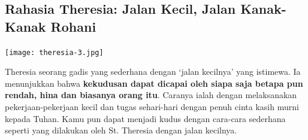 \subsection*{Rahasia Theresia: Jalan Kecil, Jalan Kanak-Kanak Rohani}

\begin{floatingfigure}[l]{2.75cm}
\begin{center}
\texttt{[image: theresia-3.jpg]}
\end{center}
\end{floatingfigure}
Theresia seorang gadis yang sederhana dengan `jalan kecilnya' yang istimewa.  Ia menunjukkan bahwa \textbf{kekudusan dapat dicapai oleh siapa saja betapa pun rendah, hina dan biasanya orang itu}. Caranya ialah dengan melaksanakan pekerjaan-pekerjaan kecil dan tugas sehari-hari dengan penuh cinta kasih murni kepada Tuhan. Kamu pun dapat menjadi kudus dengan cara-cara sederhana seperti yang dilakukan oleh St. Theresia dengan jalan kecilnya.

